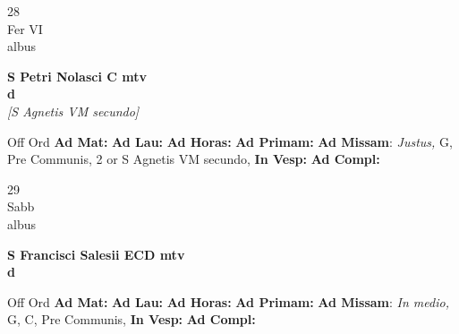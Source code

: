 \documentclass[10pt, openany]{book}
\begin{document}
        \begin{center}
            \begin{minipage}{3.5in}
                \vspace{2em}
                \begin{minipage}{0.5in}
                    {\Huge 28} \\
                    {\normalsize Fer VI} \\
                    {\normalsize albus}
                \end{minipage}
                \begin{minipage}{3.0in}
                    \textbf{ \large S Petri Nolasci C mtv \\
                    \textnormal{\normalsize d}} \\ \textit{[S Agnetis VM secundo]} \\ 
                \end{minipage}
                \begin{justify}Off Ord
                    \textbf{Ad Mat: }
                    \textbf{Ad Lau: }
                    \textbf{Ad Horas: }
                    \textbf{Ad Primam: }\textbf{Ad Missam}: \textit{Justus,} G, Pre Communis, 2 or S Agnetis VM secundo,  
                    \textbf{In Vesp: }
                    \textbf{Ad Compl: }
                \end{justify}
            \end{minipage}
        \end{center}
    
        \begin{center}
            \begin{minipage}{3.5in}
                \vspace{2em}
                \begin{minipage}{0.5in}
                    {\Huge 29} \\
                    {\normalsize Sabb} \\
                    {\normalsize albus}
                \end{minipage}
                \begin{minipage}{3.0in}
                    \textbf{ \large S Francisci Salesii ECD mtv \\
                    \textnormal{\normalsize d}} \\ 
                \end{minipage}
                \begin{justify}Off Ord
                    \textbf{Ad Mat: }
                    \textbf{Ad Lau: }
                    \textbf{Ad Horas: }
                    \textbf{Ad Primam: }\textbf{Ad Missam}: \textit{In medio,} G, C, Pre Communis,  
                    \textbf{In Vesp: }
                    \textbf{Ad Compl: }
                \end{justify}
            \end{minipage}
        \end{center}
    
\end{document}
